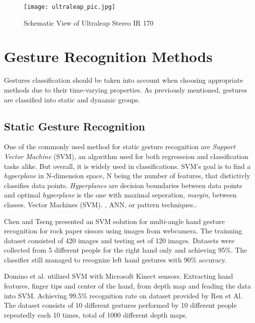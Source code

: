 \begin{figure}[h]
	\centering
    \texttt{[image: ultraleap\_pic.jpg]}
	\caption{Schematic View of Ultraleap Stereo IR 170 \cite{ultraleap}}
	\label{fig:lmcScheme}
\end{figure}



\section{Gesture Recognition Methods
}

Gestures classification should be taken into account when choosing appropriate methods due to their time-varying properties. As previously mentioned, gestures are classified into static and dynamic groups.

\subsection{Static Gesture Recognition}

One of the commonly used method for static gesture recognition are \textit{Support Vector Machine} (SVM), an algorithm used for both regresseion and classification tasks alike. But overall, it is widely used in classifications. SVM's goal is to find a \textit{hyperplane} in N-dimension space, N being the number of features, that distictivly classifies data points.\cite{svmIntroToML} 
\textit{Hyperplanes} are decision boundaries between data points and optimal \textit{hyperplane} is the one with maximal seperation, \textit{margin}, between classes.
Vector Machines (SVM). , ANN, or pattern techniques.\cite{savaris}.

Chen and Tseng \cite{chentseng} presented an SVM solution for multi-angle hand gesture recognition for rock paper sissors using images from webcamera. The trainning dataset consisted of 420 images and testing set of 120 images. 
Datasets were collected from 5 different people for the right hand only and achieving 95\%. The classifier still managed to recognize left hand gestures with 90\% accuracy. 

Domino et al. \cite{dominokinect} utilized SVM with Microsoft Kinect sensors. Extracting hand features, finger tips and center of the hand, from depth map and feading the data into SVM. Achieving 99.5\% recognition rate on dataset provided by Ren et Al. \cite{dominokinect_data} The dataset consists of 10 different gestures performed by 10 different people repeatedly each 10 times, total of 1000 different depth maps.

